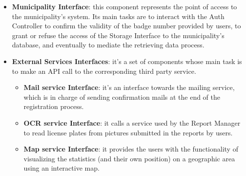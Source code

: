 \documentclass{report}
\begin{document}
\begin{itemize}
\begin{itemize}
    \end{itemize}
\item \textbf{Municipality Interface}: this component represents the point of access to the municipality's system. Its main tasks are to interact with the Auth Controller to confirm the validity of the badge number provided by users, to grant or refuse the access of the Storage Interface to the municipality's database, and eventually to mediate the retrieving data process.
\item \textbf{External Services Interfaces}: it's a set of components whose main task is to make an API call to the corresponding third party service.
    \begin{itemize}
        \item \textbf{Mail service Interface}: it's an interface towards the mailing service, which is in charge of sending confirmation mails at the end of the registration process.
        \item \textbf{OCR service Interface}: it calls a service used by the Report Manager to read license plates from pictures submitted in the reports by users.
        \item \textbf{Map service Interface}: it provides the users with the functionality of visualizing the statistics (and their own position) on a geographic area using an interactive map.
\end{itemize} 
\end{itemize}
\end{document}
